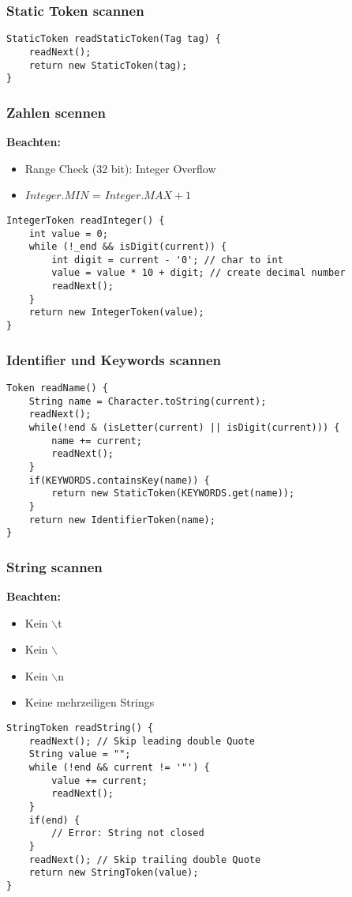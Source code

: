 \subsubsection{Static Token scannen}
\begin{lstlisting}
StaticToken readStaticToken(Tag tag) {
    readNext();
    return new StaticToken(tag);
}
\end{lstlisting}

\subsubsection{Zahlen scennen}
\textbf{Beachten:}
\begin{itemize}
    \item Range Check (32 bit): Integer Overflow
    \item $Integer.MIN$ = $Integer.MAX+1$
\end{itemize}
\begin{lstlisting}
IntegerToken readInteger() {
    int value = 0;
    while (!_end && isDigit(current)) {
        int digit = current - '0'; // char to int 
        value = value * 10 + digit; // create decimal number
        readNext();
    }
    return new IntegerToken(value);
}
\end{lstlisting}

\subsubsection{Identifier und Keywords scannen}
\begin{lstlisting}
Token readName() {
    String name = Character.toString(current);
    readNext();
    while(!end & (isLetter(current) || isDigit(current))) {
        name += current;
        readNext();
    }
    if(KEYWORDS.containsKey(name)) {
        return new StaticToken(KEYWORDS.get(name));
    }
    return new IdentifierToken(name);
}
\end{lstlisting}

\subsubsection{String scannen}
\textbf{Beachten:}
\begin{itemize}
    \item Kein $\backslash$t
    \item Kein $\backslash$\dq
    \item Kein $\backslash$n
    \item Keine mehrzeiligen Strings
\end{itemize}
\begin{lstlisting}
StringToken readString() {
    readNext(); // Skip leading double Quote
    String value = "";
    while (!end && current != '"') {
        value += current;
        readNext();
    }
    if(end) {
        // Error: String not closed
    }
    readNext(); // Skip trailing double Quote
    return new StringToken(value);
}
\end{lstlisting}

